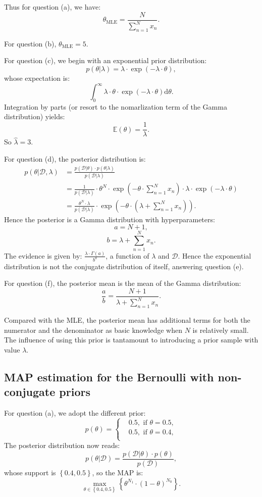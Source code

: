 \documentclass[UTF8]{ctexart}
\begin{document}
Thus for question (a), we have:
$$\theta_{\text{MLE}} = \frac{N}{\sum_{n=1}^{N}x_{n}}.$$

For question (b), $\theta_{\text{MLE}}=5$.

For question (c), we begin with an exponential prior distribution:
$$p(\theta|\lambda)=\lambda\cdot \exp(-\lambda\cdot\theta),$$
whose expectation is:
$$\int_{0}^{\infty}\lambda\cdot\theta\cdot\exp(-\lambda\cdot\theta)\text{d}\theta.$$
Integration by parts (or resort to the nomarlization term of the Gamma distribution) yields:
$$\mathbb{E}(\theta)=\frac{1}{\lambda}.$$
So $\hat{\lambda}=3.$

For question (d), the posterior distribution is:
$$
\begin{aligned}
p(\theta|\mathcal{D},\lambda)&=\frac{p(\mathcal{D}|\theta)\cdot p(\theta|\lambda)}{p(\mathcal{D}|\lambda)}\\
&=\frac{1}{p(\mathcal{D}|\lambda)}\cdot \theta^{N}\cdot\exp(-\theta\cdot\sum_{n=1}^{N}x_{n})\cdot \lambda\cdot \exp(-\lambda\cdot\theta)\\
&=\frac{\theta^{N}\cdot \lambda}{p(\mathcal{D}|\lambda)}\cdot\exp\left(-\theta\cdot\left(\lambda+\sum_{n=1}^{N}x_{n}\right)\right).
\end{aligned}
$$
Hence the posterior is a Gamma distribution with hyperparameters: 
$$a=N+1,$$ 
$$b=\lambda+\sum_{n=1}^{N}x_{n}.$$
The evidence is given by: $\frac{\lambda\cdot \Gamma(a)}{b^{a}}$, a function of $\lambda$ and $\mathcal{D}$. 
Hence the exponential distribution is not the conjugate distribution of itself, answering question (e).

For question (f), the posterior mean is the mean of the Gamma distribution:
$$\frac{a}{b}=\frac{N+1}{\lambda+\sum_{n=1}^{N}x_{n}}.$$

Compared with the MLE, the posterior mean has additional terms for both the numerator and the denominator as basic knowledge when $N$ is relatively small. 
The influence of using this prior is tantamount to introducing a prior sample with value $\lambda$.


\subsection{MAP estimation for the Bernoulli with non-conjugate priors}
For question (a), we adopt the different prior:
$$
p(\theta)=\left\{  
\begin{aligned}
&0.5,\text{ if }\theta=0.5,\\
&0.5,\text{ if }\theta=0.4,\\
\end{aligned}  
\right.  
$$
The posterior distribution now reads:
$$p(\theta|\mathcal{D})=\frac{p(\mathcal{D}|\theta)\cdot p(\theta)}{p(\mathcal{D})},$$
whose support is $\left\{0.4,0.5\right\}$, so the MAP is:
$$\max_{\theta\in\left\{0.4,0.5\right\}}\left\{\theta^{N_{1}}\cdot(1-\theta)^{N_{0}} \right\}.$$
  
\end{document}
